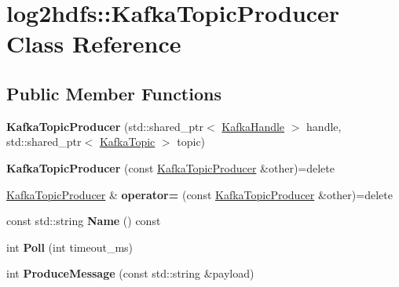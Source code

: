 \hypertarget{classlog2hdfs_1_1KafkaTopicProducer}{}\section{log2hdfs\+:\+:Kafka\+Topic\+Producer Class Reference}
\label{classlog2hdfs_1_1KafkaTopicProducer}
\subsection*{Public Member Functions}
\begin{DoxyCompactItemize}
\item 
{\bfseries Kafka\+Topic\+Producer} (std\+::shared\+\_\+ptr$<$ \hyperlink{classlog2hdfs_1_1KafkaHandle}{Kafka\+Handle} $>$ handle, std\+::shared\+\_\+ptr$<$ \hyperlink{classlog2hdfs_1_1KafkaTopic}{Kafka\+Topic} $>$ topic)\hypertarget{classlog2hdfs_1_1KafkaTopicProducer_ac9697306063b6680f77e935a0def47ca}{}\label{classlog2hdfs_1_1KafkaTopicProducer_ac9697306063b6680f77e935a0def47ca}

\item 
{\bfseries Kafka\+Topic\+Producer} (const \hyperlink{classlog2hdfs_1_1KafkaTopicProducer}{Kafka\+Topic\+Producer} \&other)=delete\hypertarget{classlog2hdfs_1_1KafkaTopicProducer_ab7e054ac1d3885043814a9256b964eec}{}\label{classlog2hdfs_1_1KafkaTopicProducer_ab7e054ac1d3885043814a9256b964eec}

\item 
\hyperlink{classlog2hdfs_1_1KafkaTopicProducer}{Kafka\+Topic\+Producer} \& {\bfseries operator=} (const \hyperlink{classlog2hdfs_1_1KafkaTopicProducer}{Kafka\+Topic\+Producer} \&other)=delete\hypertarget{classlog2hdfs_1_1KafkaTopicProducer_a30a89b43e050a406c738f4b3a6979ffd}{}\label{classlog2hdfs_1_1KafkaTopicProducer_a30a89b43e050a406c738f4b3a6979ffd}

\item 
const std\+::string {\bfseries Name} () const \hypertarget{classlog2hdfs_1_1KafkaTopicProducer_a144448699b646adb1a2e4894f89574f9}{}\label{classlog2hdfs_1_1KafkaTopicProducer_a144448699b646adb1a2e4894f89574f9}

\item 
int {\bfseries Poll} (int timeout\+\_\+ms)\hypertarget{classlog2hdfs_1_1KafkaTopicProducer_aadaf02efcab196ae353daffecc6b8592}{}\label{classlog2hdfs_1_1KafkaTopicProducer_aadaf02efcab196ae353daffecc6b8592}

\item 
int {\bfseries Produce\+Message} (const std\+::string \&payload)\hypertarget{classlog2hdfs_1_1KafkaTopicProducer_a87e73eccae3eb177e285de3b73a07237}{}\label{classlog2hdfs_1_1KafkaTopicProducer_a87e73eccae3eb177e285de3b73a07237}

\end{DoxyCompactItemize}
